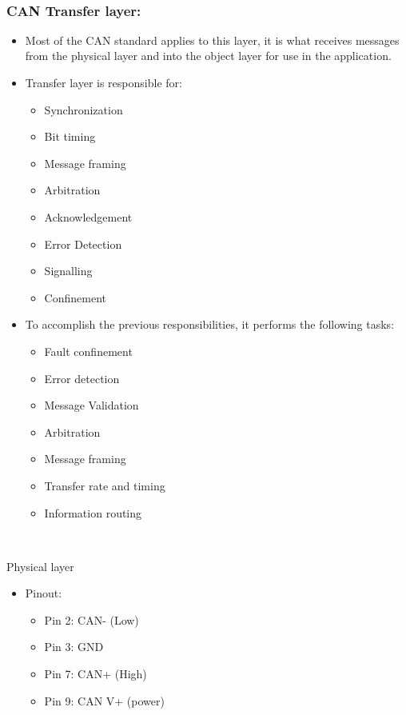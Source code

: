 ~

\subsubsection{CAN Transfer layer:}

\begin{itemize}
\item
  Most of the CAN standard applies to this layer, it is what receives
  messages from the physical layer and into the object layer for use in
  the application.
\item
  Transfer layer is responsible for:

  \begin{itemize}
  \item
    Synchronization
  \item
    Bit timing
  \item
    Message framing
  \item
    Arbitration
  \item
    Acknowledgement
  \item
    Error Detection
  \item
    Signalling
  \item
    Confinement
  \end{itemize}
\item
  To accomplish the previous responsibilities, it performs the following
  tasks:

  \begin{itemize}
  \item
    Fault confinement
  \item
    Error detection
  \item
    Message Validation
  \item
    Arbitration
  \item
    Message framing
  \item
    Transfer rate and timing
  \item
    Information routing
  \end{itemize}
\end{itemize}

~

Physical layer

\begin{itemize}
\item
  Pinout:

  \begin{itemize}
  \item
    Pin 2: CAN- (Low)
  \item
    Pin 3: GND
  \item
    Pin 7: CAN+ (High)
  \item
    Pin 9: CAN V+ (power)
  \end{itemize}
\end{itemize}


